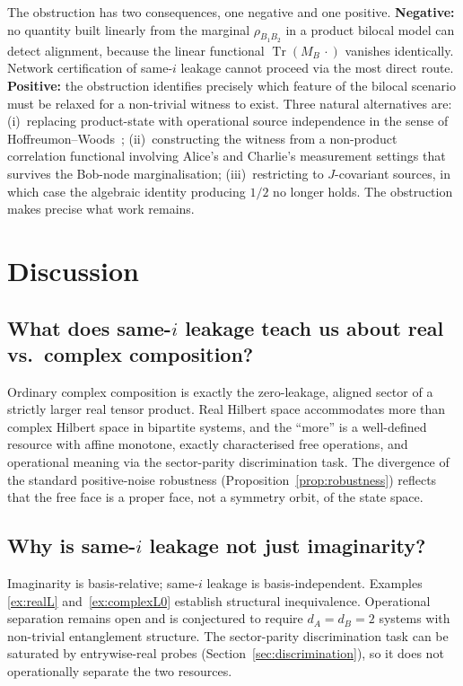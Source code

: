 \documentclass[a4paper,onecolumn,noarxiv]{quantumarticle}
\theoremstyle{plain}
\theoremstyle{definition}
\theoremstyle{remark}
\newcommand{\Mop}{M}
\newcommand{\Tr}{\operatorname{Tr}}
\begin{document}
The obstruction has two consequences, one negative and one positive.
\textbf{Negative:} no quantity built linearly from the marginal $\rho_{B_1B_2}$
in a product bilocal model can detect alignment, because the linear functional
$\Tr(\Mop_B\,\cdot)$ vanishes identically. Network certification of same-$i$ leakage
cannot proceed via the most direct route.
\textbf{Positive:} the obstruction identifies precisely which feature of the bilocal
scenario must be relaxed for a non-trivial witness to exist. Three natural
alternatives are: (i)~replacing product-state with operational source independence
in the sense of Hoffreumon--Woods~\cite{HoffreumonWoods2025,HoffreumonWoodsNonFalsified};
(ii)~constructing the witness from a non-product correlation functional involving
Alice's and Charlie's measurement settings that survives the Bob-node marginalisation;
(iii)~restricting to $J$-covariant sources, in which case the algebraic identity
producing $1/2$ no longer holds. The obstruction makes precise what work remains.

\section{Discussion}
\label{sec:discussion}

\subsection{What does same-$i$ leakage teach us about real vs.\ complex composition?}

Ordinary complex composition is exactly the zero-leakage, aligned sector of a
strictly larger real tensor product. Real Hilbert space accommodates more than
complex Hilbert space in bipartite systems, and the ``more'' is a well-defined
resource with affine monotone, exactly characterised free operations, and operational
meaning via the sector-parity discrimination task. The divergence of the standard
positive-noise robustness (Proposition~\ref{prop:robustness}) reflects that the free
face is a proper face, not a symmetry orbit, of the state space.

\subsection{Why is same-$i$ leakage not just imaginarity?}

Imaginarity is basis-relative; same-$i$ leakage is basis-independent. Examples~%
\ref{ex:realL} and~\ref{ex:complexL0} establish structural inequivalence. Operational
separation remains open and is conjectured to require $d_A=d_B=2$ systems with
non-trivial entanglement structure. The sector-parity discrimination task can be
saturated by entrywise-real probes (Section~\ref{sec:discrimination}), so it does
not operationally separate the two resources.
\end{document}
